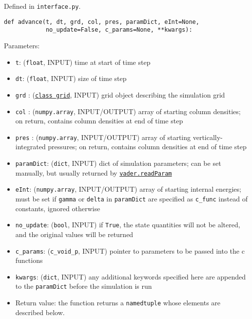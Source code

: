 \documentclass[12pt]{article}
\begin{document}
Defined in \verb=interface.py=.

\begin{verbatim}
def advance(t, dt, grd, col, pres, paramDict, eInt=None,
            no_update=False, c_params=None, **kwargs):
\end{verbatim}

Parameters:
\begin{itemize}
\item \texttt{t}: (\texttt{float}, INPUT) time at start of time step
\item \texttt{dt}: (\texttt{float}, INPUT) size of time step
\item \texttt{grd} : (\hyperref[sssec:vader.grid]{\texttt{class grid}}, INPUT) grid object describing the simulation grid
\item \texttt{col} : (\texttt{numpy.array}, INPUT/OUTPUT) array of starting column densities; on return, contains column densities at end of time step
\item \texttt{pres} : (\texttt{numpy.array}, INPUT/OUTPUT) array of starting vertically-integrated pressures; on return, contains column densities at end of time step
\item \texttt{paramDict}: (\texttt{dict}, INPUT) dict of simulation parameters; can be set manually, but usually returned by \hyperref[sssec:vader.readParam]{\texttt{vader.readParam}}
\item \texttt{eInt}: (\texttt{numpy.array}, INPUT/OUTPUT) array of starting internal energies; must be set if \verb=gamma= or \verb=delta= in \verb=paramDict= are specified as \verb=c_func= instead of constants, ignored otherwise
\item \verb=no_update=: (\texttt{bool}, INPUT) if \texttt{True}, the state quantities will not be altered, and the original values will be returned
\item \verb=c_params=: (\verb=c_void_p=, INPUT) pointer to parameters to be passed into the c functions
\item \verb=kwargs=: (\verb=dict=, INPUT) any additional keywords specified here are appended to the \texttt{paramDict} before the simulation is run
\item Return value: the function returns a \verb=namedtuple= whose elements are described below.
\end{itemize}
\end{document}
